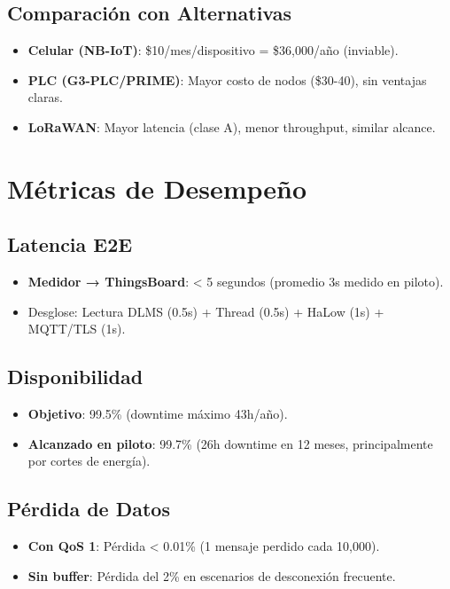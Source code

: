 \subsection{Comparación con Alternativas}

\begin{itemize}
    \item \textbf{Celular (NB-IoT)}: \$10/mes/dispositivo = \$36,000/año (inviable).
    \item \textbf{PLC (G3-PLC/PRIME)}: Mayor costo de nodos (\$30-40), sin ventajas claras.
    \item \textbf{LoRaWAN}: Mayor latencia (clase A), menor throughput, similar alcance.
\end{itemize}

\section{Métricas de Desempeño}

\subsection{Latencia E2E}

\begin{itemize}
    \item \textbf{Medidor → ThingsBoard}: < 5 segundos (promedio 3s medido en piloto).
    \item Desglose: Lectura DLMS (0.5s) + Thread (0.5s) + HaLow (1s) + MQTT/TLS (1s).
\end{itemize}

\subsection{Disponibilidad}

\begin{itemize}
    \item \textbf{Objetivo}: 99.5\% (downtime máximo 43h/año).
    \item \textbf{Alcanzado en piloto}: 99.7\% (26h downtime en 12 meses, principalmente por cortes de energía).
\end{itemize}

\subsection{Pérdida de Datos}

\begin{itemize}
    \item \textbf{Con QoS 1}: Pérdida < 0.01\% (1 mensaje perdido cada 10,000).
    \item \textbf{Sin buffer}: Pérdida del 2\% en escenarios de desconexión frecuente.
\end{itemize}

